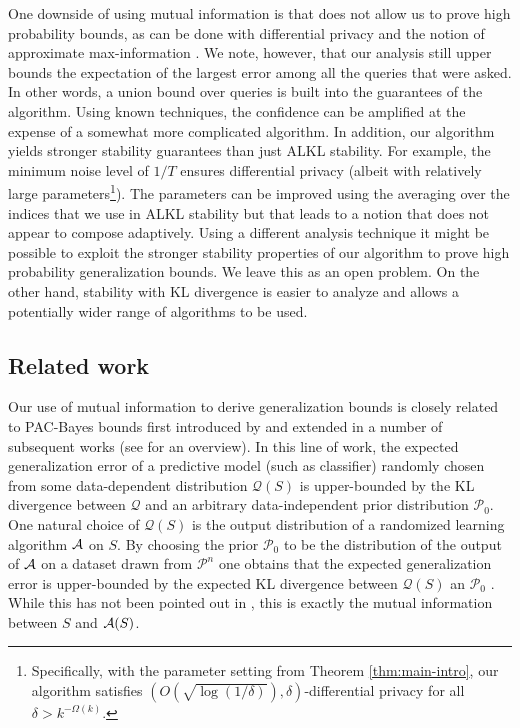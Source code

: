 \documentclass[final,12pt]{colt2018}
\providecommand{\cP}{{\mathcal P}}
\providecommand{\cQ}{{\mathcal Q}}
\begin{document}
One downside of using mutual information is that does not allow us to prove high probability bounds, as can be done with differential privacy and the notion of approximate max-information \citep{DworkFHPRR15:arxiv}. We note, however, that our analysis still upper bounds the expectation of the largest error among all the queries that were asked. In other words, a union bound over queries is built into the guarantees of the algorithm. Using known techniques, the confidence can be amplified at the expense of a somewhat more complicated algorithm. In addition, our algorithm yields stronger stability guarantees than just ALKL stability. For example, the minimum noise level of $1/T$ ensures differential privacy (albeit with relatively large parameters\footnote{Specifically, with the parameter setting from Theorem \ref{thm:main-intro}, our algorithm satisfies $\left(O\left(\sqrt{\log(1/\delta)}\right),\delta\right)$-differential privacy for all $\delta>k^{-\Omega(k)}$.}). The parameters can be improved using the averaging over the indices that we use in ALKL stability but that leads to a notion that does not appear to compose adaptively. Using a different analysis technique it might be possible to exploit the stronger stability properties of our algorithm to prove high probability generalization bounds. We leave this as an open problem.  On the other hand, stability with KL divergence is easier to analyze and allows a potentially wider range of algorithms to be used.

\subsection{Related work}
Our use of mutual information to derive generalization bounds is closely related to PAC-Bayes bounds first introduced by \citet{McAllester99} and extended in a number of subsequent works (see \citep{McAllester13} for an overview). In this line of work, the expected generalization error of a predictive model (such as classifier) randomly chosen from some data-dependent distribution $\cQ(S)$ is upper-bounded by the KL divergence between $\cQ$ and an arbitrary data-independent prior distribution $\cP_0$. One natural choice of $\cQ(S)$ is the output distribution of a randomized learning algorithm ${\mathcal A}$ on $S$. By choosing the prior $\cP_0$ to be the distribution of the output of ${\mathcal A}$ on a dataset drawn from $\cP^n$ one obtains that the expected generalization error is upper-bounded by the expected KL divergence between $\cQ(S)$ an $\cP_0$ \citep{McAllester13}. While this has not been pointed out in \citep{McAllester13}, this is exactly the mutual information between $S$ and ${\mathcal A}(S)$.
\end{document}
